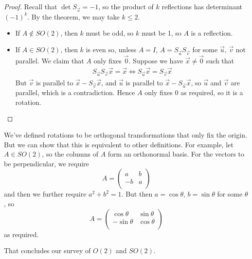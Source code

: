 \documentclass{../../template/note}
\begin{document}
    \begin{proof}
        Recall that \(\det S_{\vec v} = -1\), so the product of \(k\) reflections has determinant \((-1)^k\). By the theorem, we may take \(k \leq 2\).
        \begin{itemize}
            \item If \(A \notin SO(2)\), then \(k\) must be odd, so \(k\) must be 1, so \(A\) is a reflection.
            \item If \(A \in SO(2)\), then \(k\) is even so, unless \(A = I\), \(A = S_{\vec u}S_{\vec v}\) for some \(\vec u\), \(\vec v\) not parallel. We claim that \(A\) only fixes \(\vec 0\). Suppose we have \(\vec x \neq \vec 0\) such that
            \begin{align*}
                S_{\vec u}S_{\vec v}\vec x = \vec x \iff S_{\vec u} \vec x = S_{\vec v} \vec x
            \end{align*}
            But \(\vec v\) is parallel to \(\vec x - S_{\vec v} \vec x\), and \(\vec u\) is parallel to \(\vec x - S_{\vec u} \vec x\), so \(\vec u\) and \(\vec v\) are parallel, which is a contradiction. Hence \(A\) only fixes 0 as required, so it is a rotation.            
        \end{itemize}
    \end{proof}
    
    \begin{remark*}
        We've defined rotations to be orthogonal transformations that only fix the origin. But we can show that this is equivalent to other definitions. For example, let \(A \in SO(2)\), so the columns of \(A\) form an orthonormal basis. For the vectors to be perpendicular, we require
        \[
            A = \begin{pmatrix}
             a & b \\
             -b & a \\
            \end{pmatrix}
        \]
        and then we further require \(a^2 + b^2 = 1\). But then \(a = \cos \theta\), \(b = \sin \theta\) for some \(\theta\), so
        \[
            A = \begin{pmatrix}
             \cos \theta & \sin \theta \\
             -\sin \theta & \cos \theta \\
            \end{pmatrix}
        \]
        as required.
    \end{remark*}

    That concludes our survey of \(O(2)\) and \(SO(2)\).
    
\end{document}

